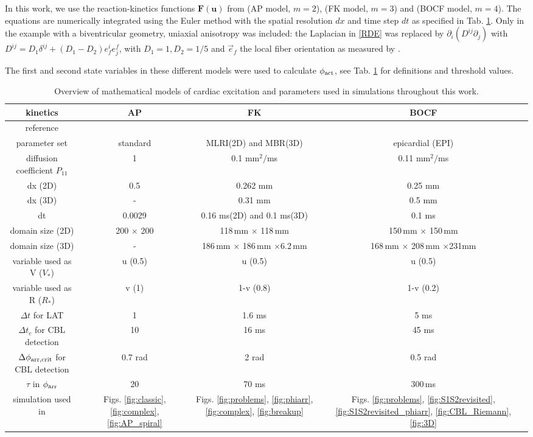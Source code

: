 \documentclass{article}
\newcommand{\phiact}{\ensuremath{\phi_{\rm act}}}
\newcommand{\phiarr}{\ensuremath{\phi_{\rm arr}}}
\newcommand{\VS}{V_*}
\newcommand{\RS}{R_*}
\newcommand{\uu}{\mathbf{u}}
\newcommand{\dd}{\partial}
\begin{document}
In this work, we use the reaction-kinetics functions $\mathbf{F}(\uu)$ from \cite{Aliev:1996} (AP model, $m=2$), \cite{Fenton:1998} (FK model, $m=3$) and \cite{BuenoOrovio:2008} (BOCF model, $m=4$). The equations are numerically integrated using the Euler method with the spatial resolution $dx$ and time step $dt$ as specified in Tab. \ref{tab:sims}. Only in the example with a biventricular geometry, uniaxial anisotropy was included: the Laplacian in \eqref{RDE} was replaced by $\dd_i (D^{ij} \dd_j)$ with $D^{ij} = D_1 \delta^{ij} + (D_1-D_2) e_f^i e^f_j$, with $D_1=1, D_2=1/5$ and $\vec{e}_f$ the local fiber orientation as measured by \cite{Hren:1995}. 

The first and second state variables in these different models were used to calculate $\phiact$, see Tab. \ref{tab:sims} for definitions and threshold values. 

\begin{table}[b]
    \centering
    \begin{tabular}{c|ccc}
    kinetics & AP & FK & BOCF \\ \hline
    reference & \small{\citep{Aliev:1996}} & \small{\citep{Fenton:1998}} & \tiny{\citep{BuenoOrovio:2008}} \\
    parameter set & standard & MLRI(2D) and MBR(3D) & epicardial (EPI) \\
    diffusion coefficient $P_{11}$ & 1 & 0.1 mm$^2/$ms & 0.11 mm$^2/$ms  \\
    dx (2D) & 0.5  & 0.262 mm & 0.25 mm \\ 
    dx (3D)  & - & 0.31 mm & 0.5 mm \\ 
    dt & 0.0029 & 0.16 ms(2D) and 0.1 ms(3D) & 0.1 ms \\
   domain size (2D) & 200 $\times$ 200 &  118\,mm $\times$ 118\,mm & 150\,mm $\times$ 150\,mm \\
  domain size (3D) & -  & \tiny{186\,mm $\times$ 186\,mm $\times $6.2\,mm} & \tiny{168\,mm $\times$ 208\,mm $\times $231mm} \\
    variable used as V ($\VS$) & u (0.5) & u (0.5) &u (0.5)  \\
    variable used as R ($\RS$) & v (1) & 1-v (0.8) & 1-v (0.2) \\
    $\Delta t$ for LAT & 1 & 1.6 ms & 5 ms\\
    $\Delta t_c$ for CBL detection & 10 & 16 ms & 45 ms\\
    $\Delta\phi_{\rm arr, crit}$ for CBL detection & 0.7 rad & 2 rad  & 0.5 rad \\
   $\tau$ in $\phiarr$& 20 & 70 ms & 300\,ms \\
    simulation used in &  Figs. \ref{fig:classic}, \ref{fig:complex}, \ref{fig:AP_spiral} & Figs. \ref{fig:problems}, \ref{fig:phiarr}, \ref{fig:complex}, \ref{fig:breakup} & Figs. \ref{fig:problems}, \ref{fig:S1S2revisited}, \ref{fig:S1S2revisited_phiarr}, \ref{fig:CBL_Riemann}, \ref{fig:3D} \\ %
    \end{tabular}
    \caption{Overview of mathematical models of cardiac excitation and parameters used in simulations throughout this work. }
    \label{tab:sims}
\end{table}
\end{document}
